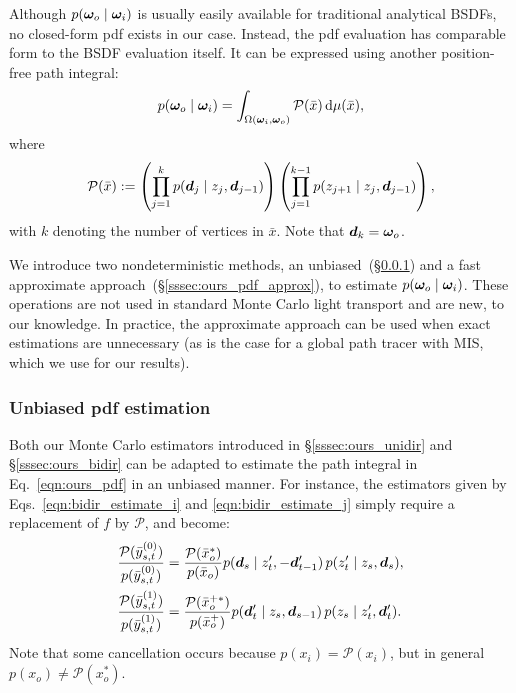 Although $p(\bm{\omega}_o \;|\; \bm{\omega}_i)$ is usually easily available for traditional analytical BSDFs, no closed-form pdf exists in our case. Instead, the pdf evaluation has comparable form to the BSDF evaluation itself. It can be expressed using another position-free path integral:
%
\begin{equation}
\label{eqn:ours_pdf}
p(\bm{\omega}_o \;|\; \bm{\omega}_i) = \int_{\Omega(\bm{\omega}_i, \bm{\omega}_o)} \mathcal{P}(\bar{x}) \,\mathrm{d}\mu(\bar{x}),
\end{equation}
%
where
%
\begin{equation}
\mathcal{P}(\bar{x}) := \left(\prod_{j = 1}^k p(\bm{d}_j \;|\; z_j, \bm{d}_{j - 1})\right) \left(\prod_{j = 1}^{k - 1} p(z_{j + 1} \;|\; z_j, \bm{d}_{j - 1})\right),
\end{equation}
%
with $k$ denoting the number of vertices in $\bar{x}$. Note that $\bm{d}_k = \bm{\omega}_o$.

We introduce two nondeterministic methods, an unbiased~(\S\ref{sssec:ours_pdf_unbiased}) and a fast approximate approach~(\S\ref{sssec:ours_pdf_approx}), to estimate $p(\bm{\omega}_o \;|\; \bm{\omega}_i)$.
These operations are not used in standard Monte Carlo light transport and are new, to our knowledge.
In practice, the approximate approach can be used when exact estimations are unnecessary (as is the case for a global path tracer with MIS, which we use for our results).

\subsubsection{Unbiased pdf estimation}
\label{sssec:ours_pdf_unbiased}
%
Both our Monte Carlo estimators introduced in \S\ref{sssec:ours_unidir} and \S\ref{sssec:ours_bidir} can be adapted to estimate the path integral in Eq.~\eqref{eqn:ours_pdf} in an unbiased manner.
For instance, the estimators given by Eqs.~\eqref{eqn:bidir_estimate_i} and \eqref{eqn:bidir_estimate_j} simply require a replacement of $f$ by $\mathcal P$, and become:
%
\begin{align}
	\label{eqn:bidir_pdf_i}
	\frac{\mathcal{P}(\bar{y}^{(0)}_{s, t})}{p(\bar{y}^{(0)}_{s, t})} &= \frac{\mathcal{P}(\bar{x}_o^*)}{p(\bar{x}_o)}
	 p( \bm{d}_s \;|\; z'_t, -\bm{d}'_{t - 1}) \, p(z'_t \;|\; z_s, \bm{d}_s),\\
	\label{eqn:bidir_pdf_j}
	\frac{\mathcal{P}(\bar{y}^{(1)}_{s, t})}{p(\bar{y}^{(1)}_{s, t})} &= \frac{\mathcal{P}(\bar{x}_o^{+*})}{p(\bar{x}_o^+)}
	 p( \bm{d}'_t \;|\; z_s, \bm{d}_{s - 1}) \, p(z_s \;|\; z'_t, \bm{d}'_t ).
\end{align}
%
Note that some cancellation occurs because $p(x_i) = \mathcal P(x_i)$, but in general $p(x_o) \neq \mathcal P(x_o^*)$.

